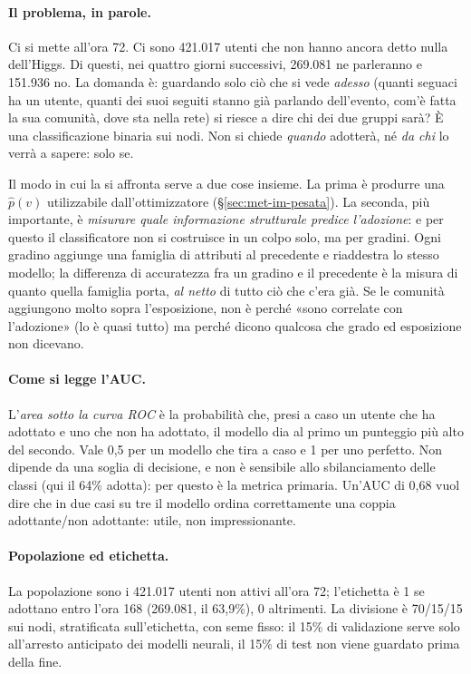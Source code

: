 \documentclass[11pt,a4paper]{article}
\newcommand{\phat}{\hat{p}}
\begin{document}
\paragraph{Il problema, in parole.} Ci si mette all'ora 72. Ci sono 421.017 utenti che non hanno ancora detto nulla dell'Higgs. Di questi, nei quattro giorni successivi, 269.081 ne parleranno e 151.936 no. La domanda è: guardando solo ciò che si vede \emph{adesso} (quanti seguaci ha un utente, quanti dei suoi seguiti stanno già parlando dell'evento, com'è fatta la sua comunità, dove sta nella rete) si riesce a dire chi dei due gruppi sarà? È una classificazione binaria sui nodi. Non si chiede \emph{quando} adotterà, né \emph{da chi} lo verrà a sapere: solo se.

Il modo in cui la si affronta serve a due cose insieme. La prima è produrre una $\phat(v)$ utilizzabile dall'ottimizzatore (\S\ref{sec:met-im-pesata}). La seconda, più importante, è \emph{misurare quale informazione strutturale predice l'adozione}: e per questo il classificatore non si costruisce in un colpo solo, ma per gradini. Ogni gradino aggiunge una famiglia di attributi al precedente e riaddestra lo stesso modello; la differenza di accuratezza fra un gradino e il precedente è la misura di quanto quella famiglia porta, \emph{al netto} di tutto ciò che c'era già. Se le comunità aggiungono molto sopra l'esposizione, non è perché «sono correlate con l'adozione» (lo è quasi tutto) ma perché dicono qualcosa che grado ed esposizione non dicevano.

\paragraph{Come si legge l'AUC.} L'\emph{area sotto la curva ROC} \citep{fawcett2006} è la probabilità che, presi a caso un utente che ha adottato e uno che non ha adottato, il modello dia al primo un punteggio più alto del secondo. Vale 0,5 per un modello che tira a caso e 1 per uno perfetto. Non dipende da una soglia di decisione, e non è sensibile allo sbilanciamento delle classi (qui il 64\% adotta): per questo è la metrica primaria. Un'AUC di 0,68 vuol dire che in due casi su tre il modello ordina correttamente una coppia adottante/non adottante: utile, non impressionante.

\paragraph{Popolazione ed etichetta.} La popolazione sono i 421.017 utenti non attivi all'ora 72; l'etichetta è 1 se adottano entro l'ora 168 (269.081, il 63,9\%), 0 altrimenti. La divisione è 70/15/15 sui nodi, stratificata sull'etichetta, con seme fisso: il 15\% di validazione serve solo all'arresto anticipato dei modelli neurali, il 15\% di test non viene guardato prima della fine.
\end{document}
